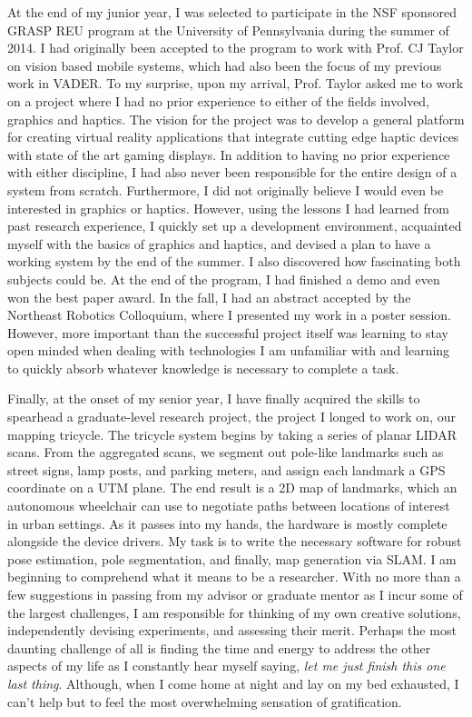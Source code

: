 \documentclass{article}
\begin{document}
At the end of my junior year, I was selected to participate in the NSF
sponsored GRASP REU program at the University of Pennsylvania during the summer
of 2014. I had originally been accepted to the program to work with Prof. CJ
Taylor on vision based mobile systems, which had also been the focus of my
previous work in VADER. To my surprise, upon my arrival, Prof. Taylor asked me
to work on a project where I had no prior experience to either of the fields
involved, graphics and haptics. The vision for the project was to develop a
general platform for creating virtual reality applications that integrate
cutting edge haptic devices with state of the art gaming displays. In addition
to having no prior experience with either discipline, I had also never been
responsible for the entire design of a system from scratch. Furthermore, I did
not originally believe I would even be interested in graphics or haptics.
However, using the lessons I had learned from past research experience, I
quickly set up a development environment, acquainted myself with the basics of
graphics and haptics, and devised a plan to have a working system by the end of
the summer. I also discovered how fascinating both subjects could be. At the
end of the program, I had finished a demo and even won the best paper award. In
the fall, I had an abstract accepted by the Northeast Robotics Colloquium,
where I presented my work in a poster session. However, more important than 
the successful project itself was learning to stay open minded when dealing
with technologies I am unfamiliar with and learning to quickly absorb whatever
knowledge is necessary to complete a task.

Finally, at the onset of my senior year, I have finally acquired the skills to
spearhead a graduate-level research project, the project I longed to work on,
our mapping tricycle. The tricycle system begins by taking a series of planar
LIDAR scans. From the aggregated scans, we segment out pole-like landmarks such
as street signs, lamp posts, and parking meters, and assign each landmark a GPS
coordinate on a UTM plane.  The end result is a 2D map of landmarks, which an
autonomous wheelchair can use to negotiate paths between locations of interest
in urban settings. As it passes into my hands, the hardware is mostly complete
alongside the device drivers. My task is to write the necessary software for
robust pose estimation, pole segmentation, and finally, map generation via
SLAM. I am beginning to comprehend what it means to be a researcher. With no
more than a few suggestions in passing from my advisor or graduate mentor as I
incur some of the largest challenges, I am responsible for thinking of my own
creative solutions, independently devising experiments, and assessing their
merit.  Perhaps the most daunting challenge of all is finding the time  and
energy to address the other aspects of my life as I constantly hear myself
saying, \emph{let me just finish this one last thing}. Although, when I come
home at night and lay on my bed exhausted, I can't help but to feel the most
overwhelming sensation of gratification.
\end{document}
